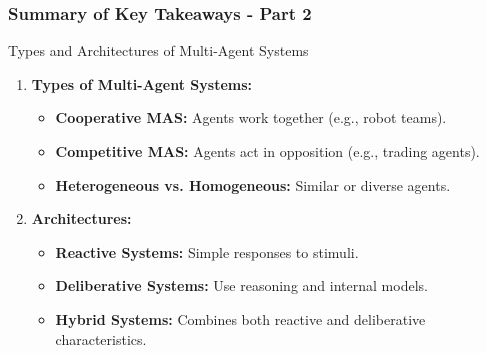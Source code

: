 \documentclass[aspectratio=169]{beamer}
\begin{document}
\begin{frame}[fragile]
    \frametitle{Summary of Key Takeaways - Part 2}
    \begin{block}{Types and Architectures of Multi-Agent Systems}
        \begin{enumerate}
            \item \textbf{Types of Multi-Agent Systems:}
                \begin{itemize}
                    \item \textbf{Cooperative MAS:} Agents work together (e.g., robot teams).
                    \item \textbf{Competitive MAS:} Agents act in opposition (e.g., trading agents).
                    \item \textbf{Heterogeneous vs. Homogeneous:} Similar or diverse agents.
                \end{itemize}
            \item \textbf{Architectures:}
                \begin{itemize}
                    \item \textbf{Reactive Systems:} Simple responses to stimuli.
                    \item \textbf{Deliberative Systems:} Use reasoning and internal models.
                    \item \textbf{Hybrid Systems:} Combines both reactive and deliberative characteristics.
                \end{itemize}
        \end{enumerate}
    \end{block}
\end{frame}
\end{document}
